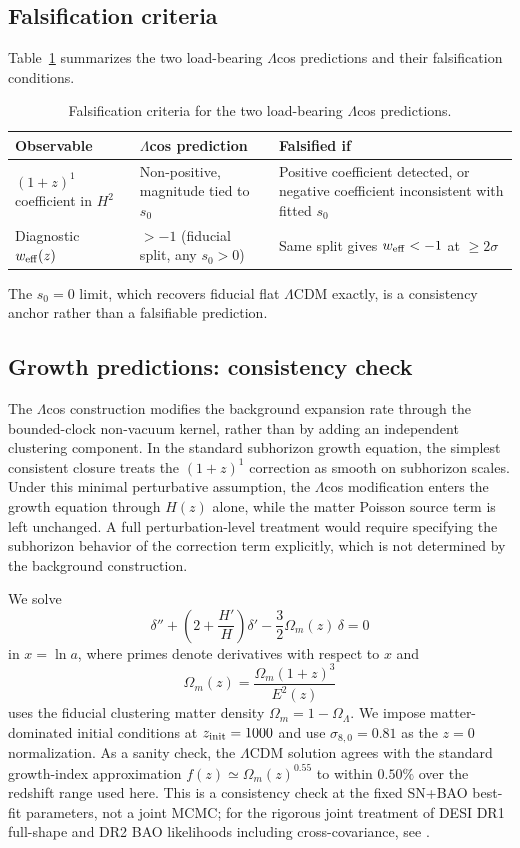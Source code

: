\documentclass[
  aps,
  prd,
  onecolumn,         %
  nofootinbib,
  longbibliography
]{revtex4-2}
\begin{document}
\subsection{Falsification criteria}\label{sec:falsification}

Table~\ref{tab:falsification} summarizes the two load-bearing $\Lambda$cos predictions and their falsification conditions.

\begin{table}[!ht]
\centering\footnotesize
\caption{Falsification criteria for the two load-bearing $\Lambda$cos predictions.}\label{tab:falsification}
\begin{tabular}{@{}lll@{}}
\toprule
Observable & $\Lambda$cos prediction & Falsified if \\
\midrule

$(1+z)^1$ coefficient in $H^2$ & Non-positive, magnitude tied to $s_0$ & Positive
coefficient detected, or negative coefficient inconsistent with fitted
$s_0$ \\
Diagnostic $w_{\rm eff}(z)$ & $> -1$ (fiducial split, any $s_0 > 0$) & Same split gives $w_{\rm eff} < -1$ at $\geq 2\sigma$ \\
\bottomrule
\end{tabular}
\end{table}

The $s_0 = 0$ limit, which recovers fiducial flat $\Lambda$CDM exactly, is a
consistency anchor rather than a falsifiable prediction.

\subsection{Growth predictions: consistency check}\label{sec:growth}

The $\Lambda$cos construction modifies the background expansion rate
through the bounded-clock non-vacuum kernel, rather than by adding
an independent clustering component. In the
standard subhorizon growth equation, the simplest consistent closure
treats the $(1+z)^1$ correction as smooth on subhorizon scales. Under
this minimal perturbative assumption, the $\Lambda$cos modification
enters the growth equation through $H(z)$ alone, while the matter
Poisson source term is left unchanged. A full perturbation-level
treatment would require specifying the subhorizon behavior of the
correction term explicitly, which is not determined by the background
construction.

We solve
\[
\delta''+\left(2+\frac{H'}{H}\right)\delta'
-\frac{3}{2}\Omega_m(z)\,\delta=0
\]
in $x=\ln a$, where primes denote derivatives with respect to $x$ and
\[
\Omega_m(z)=\frac{\Omega_m(1+z)^3}{E^2(z)}
\]
uses the fiducial clustering matter density $\Omega_m=1-\Omega_\Lambda$.
We impose matter-dominated initial conditions at $z_{\rm init}=1000$
and use $\sigma_{8,0}=0.81$ as the $z=0$ normalization. As a sanity
check, the $\Lambda$CDM solution agrees with the standard growth-index
approximation $f(z)\simeq\Omega_m(z)^{0.55}$ to within $0.50\%$ over the
redshift range used here. This is a consistency check at the fixed
SN+BAO best-fit parameters, not a joint MCMC; for the rigorous joint
treatment of DESI DR1 full-shape and DR2 BAO likelihoods including
cross-covariance, see \cite{ref19,ref20}.
\end{document}
